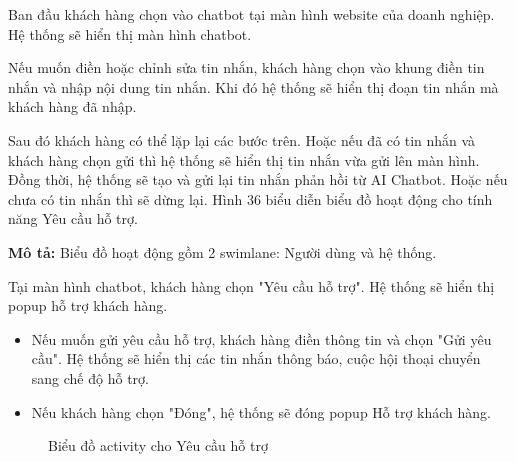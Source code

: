 Ban đầu khách hàng chọn vào chatbot tại màn hình website của doanh nghiệp. Hệ thống sẽ hiển thị màn hình chatbot.

Nếu muốn điền hoặc chỉnh sửa tin nhắn, khách hàng chọn vào khung điền tin nhắn và nhập nội dung tin nhắn. Khi đó hệ thống sẽ hiển thị đoạn tin nhắn mà khách hàng đã nhập.

Sau đó khách hàng có thể lặp lại các bước trên. Hoặc nếu đã có tin nhắn và khách hàng chọn gửi thì hệ thống sẽ hiển thị tin nhắn vừa gửi lên màn hình. Đồng thời, hệ thống sẽ tạo và gửi lại tin nhắn phản hồi từ AI Chatbot. Hoặc nếu chưa có tin nhắn thì sẽ dừng lại.
Hình 36 biểu diễn biểu đồ hoạt động cho tính năng Yêu cầu hỗ trợ.

\textbf{Mô tả:}
Biểu đồ hoạt động gồm 2 swimlane: Người dùng và hệ thống.

Tại màn hình chatbot, khách hàng chọn "Yêu cầu hỗ trợ". Hệ thống sẽ hiển thị popup hỗ trợ khách hàng.
\begin{itemize}
    \item Nếu muốn gửi yêu cầu hỗ trợ, khách hàng điền thông tin và chọn "Gửi yêu cầu". Hệ thống sẽ hiển thị các tin nhắn thông báo, cuộc hội thoại chuyển sang chế độ hỗ trợ.
    \item Nếu khách hàng chọn "Đóng", hệ thống sẽ đóng popup Hỗ trợ khách hàng.
\end{itemize}

\begin{figure}[H]
    \centering
    
    \vspace{0.5cm}
    \caption{Biểu đồ activity cho Yêu cầu hỗ trợ}
    \label{fig:enter-label}
\end{figure}

